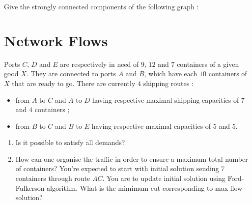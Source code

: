 \documentclass[11pt,a4paper]{article}
\begin{document}
\begin{question}[subtitle={Strongly Connected Components}]
  Give the strongly connected components of the following graph :
    \begin{center}
  \end{center}
\end{question}

\section{Network Flows}

\begin{question}[subtitle={Flows}]
  Ports $C$, $D$ and $E$ are respectively in need of $9$, $12$ and $7$
  containers of a given good $X$. They are connected to ports $A$ and
  $B$, which have each $10$ containers of $X$ that are ready to
  go. There are currently $4$ shipping routes : 
  \begin{itemize}
  \item from $A$ to $C$ and $A$ to $D$ having respective maximal
    shipping capacities of $7$ and $4$ containers ;
  \item from $B$ to $C$ and $B$ to $E$ having respective maximal
    capacities of $5$ and $5$.
  \end{itemize}
  \begin{enumerate}
  \item Is it possible to satisfy all demands?
  \item How can one organise the traffic in order to ensure a maximum
    total number of containers? You're expected to start with initial
    solution sending $7$ containers through route $AC$. You are to
    update initial solution using Ford-Fulkerson algorithm. What is
    the mimimum cut corresponding to max flow solution?
  \end{enumerate}
\end{question}
\end{document}
